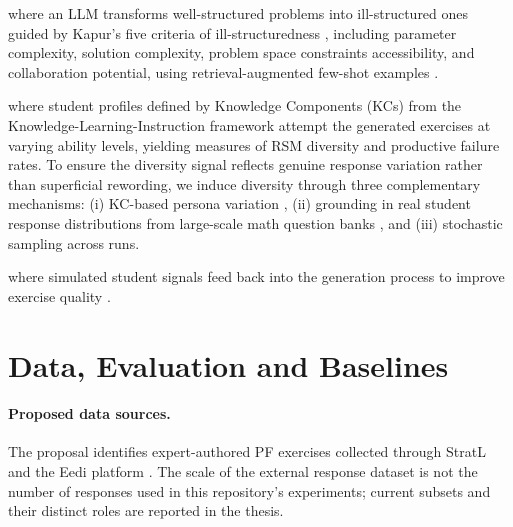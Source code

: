 \documentclass[11pt,a4paper]{article}
\begin{document}
\begin{description}
    \setlength{\itemsep}{0.5em}
    
    \item[\textbf{(1) Exercise generation}] where an LLM transforms well-structured problems into ill-structured ones guided by Kapur's  five criteria of ill-structuredness \cite{kapur2009}, including parameter complexity, solution complexity, problem space constraints accessibility, and collaboration potential, using retrieval-augmented few-shot examples \cite{puech2025}.
    \item[\textbf{(2) Simulated student evaluation}] where student profiles defined by Knowledge Components (KCs) from the Knowledge-Learning-Instruction framework \cite{lu2024} attempt the generated exercises at varying ability levels, yielding measures of RSM diversity and productive failure rates. To ensure the diversity signal reflects genuine response variation rather than superficial rewording, we induce diversity through three complementary mechanisms: (i) KC-based persona variation \cite{lu2024}, (ii) grounding in real student response distributions from large-scale math question banks \cite{wang2021eedi}, and (iii) stochastic sampling across runs.
    \item[\textbf{(3) Iterative refinement}] where simulated student signals feed back into the generation process to improve exercise quality \cite{madaan2023selfrefine}.
\end{description}
\section*{Data, Evaluation and Baselines}

\paragraph{Proposed data sources.} The proposal identifies expert-authored PF exercises collected through StratL \cite{puech2025} and the Eedi platform \cite{wang2021eedi}. The scale of the external response dataset is not the number of responses used in this repository's experiments; current subsets and their distinct roles are reported in the thesis.
\end{document}
